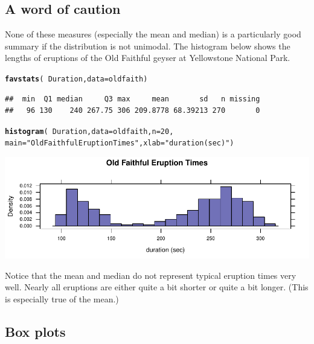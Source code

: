 \documentclass[twoside]{book}\usepackage[]{graphicx}\usepackage[]{xcolor}
\makeatletter
\def\maxwidth{ %
  \ifdim\Gin@nat@width>\linewidth
    \linewidth
  \else
    \Gin@nat@width
  \fi
}
\newcommand{\hlnum}[1]{\textcolor[rgb]{0.686,0.059,0.569}{#1}}%
\newcommand{\hlstr}[1]{\textcolor[rgb]{0.192,0.494,0.8}{#1}}%
\newcommand{\hlopt}[1]{\textcolor[rgb]{0,0,0}{#1}}%
\newcommand{\hlstd}[1]{\textcolor[rgb]{0.345,0.345,0.345}{#1}}%
\newcommand{\hlkwc}[1]{\textcolor[rgb]{0.333,0.667,0.333}{#1}}%
\newcommand{\hlkwd}[1]{\textcolor[rgb]{0.737,0.353,0.396}{\textbf{#1}}}%
\newenvironment{kframe}{%
 \def\at@end@of@kframe{}%
 \ifinner\ifhmode%
  \def\at@end@of@kframe{\end{minipage}}%
  \begin{minipage}{\columnwidth}%
 \fi\fi%
 \def\FrameCommand##1{\hskip\@totalleftmargin \hskip-\fboxsep
 \colorbox{shadecolor}{##1}\hskip-\fboxsep
     \hskip-\linewidth \hskip-\@totalleftmargin \hskip\columnwidth}%
 \MakeFramed {\advance\hsize-\width
   \@totalleftmargin\z@ \linewidth\hsize
   \@setminipage}}%
 {\par\unskip\endMakeFramed%
 \at@end@of@kframe}
\newenvironment{knitrout}{}{} %
\makeatother
\begin{document}
\subsection{A word of caution}
None of these measures (especially the mean and median) 
is a particularly good summary if the distribution is not unimodal.  
The histogram below shows the lengths of eruptions of the Old Faithful geyser
at Yellowstone National Park.
\begin{knitrout}
\color{fgcolor}\begin{kframe}
\begin{alltt}
\hlkwd{favstats}\hlstd{(}\hlopt{~} \hlstd{Duration,} \hlkwc{data}\hlstd{=oldfaith)}
\end{alltt}
\begin{verbatim}
##  min  Q1 median     Q3 max     mean       sd   n missing
##   96 130    240 267.75 306 209.8778 68.39213 270       0
\end{verbatim}
\begin{alltt}
\hlkwd{histogram}\hlstd{(} \hlopt{~} \hlstd{Duration,} \hlkwc{data}\hlstd{=oldfaith,}  \hlkwc{n}\hlstd{=}\hlnum{20}\hlstd{,}
        \hlkwc{main}\hlstd{=}\hlstr{"Old Faithful Eruption Times"}\hlstd{,} \hlkwc{xlab}\hlstd{=}\hlstr{"duration (sec)"}\hlstd{)}
\end{alltt}
\end{kframe}

{\centering \includegraphics[width=\maxwidth]{figures/fig-faithful-1} 

}



\end{knitrout}
Notice that the mean and median do not represent typical eruption times very well.  
Nearly all eruptions are either quite a bit shorter or quite a bit longer.  
(This is especially true of the mean.)


\subsection{Box plots}
\end{document}
